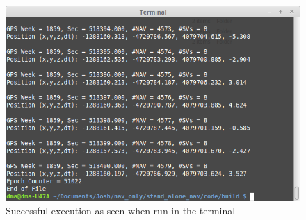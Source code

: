 \documentclass[10pt,a4paper]{article}
\begin{document}
\begin{figure}[h!]
\centering
\includegraphics[scale=0.6]{terminal_success.png}
\caption{Successful execution as seen when run in the terminal}
\label{fig:terminal_success}
\end{figure}
\end{document}
